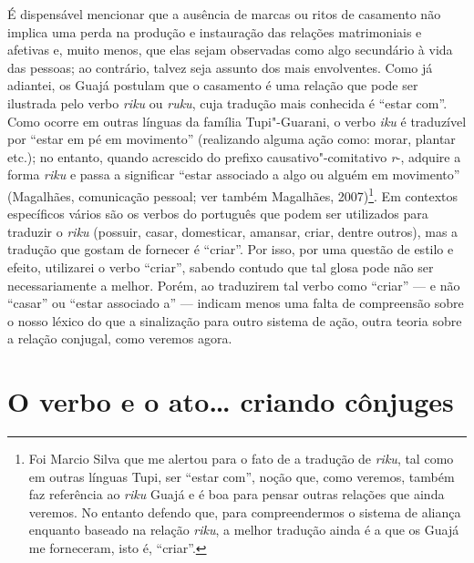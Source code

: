 É dispensável mencionar que a ausência de marcas ou ritos de casamento
não implica uma perda na produção e instauração das relações
matrimoniais e afetivas e, muito menos, que elas sejam observadas como
algo secundário à vida das pessoas; ao contrário, talvez seja assunto
dos mais envolventes. Como já adiantei, os Guajá postulam que o
casamento é uma relação que pode ser ilustrada pelo verbo \emph{riku} ou
\emph{ruku}, cuja tradução mais conhecida é ``estar com''. Como ocorre em
outras línguas da família Tupi"-Guarani, o verbo \emph{iku} é traduzível
por ``estar em pé em movimento'' (realizando alguma ação como: morar,
plantar etc.); no entanto, quando acrescido do prefixo
causativo"-comitativo \emph{r}-, adquire a forma \emph{riku} e passa a
significar ``estar associado a algo ou alguém em movimento'' (Magalhães,
comunicação pessoal; ver também Magalhães, 2007)\footnote{Foi Marcio
  Silva que me alertou para o fato de a tradução de \emph{riku}, tal
  como em outras línguas Tupi, ser ``{estar com}'', noção que, como
  veremos, também faz referência ao \emph{riku} Guajá e é boa para
  pensar outras relações que ainda veremos. No entanto defendo que, para
  compreendermos o sistema de aliança enquanto baseado na relação
  \emph{riku}, a melhor tradução ainda é a que os Guajá me forneceram,
  isto é, ``{criar}''.}. Em contextos específicos vários são os verbos do
português que podem ser utilizados para traduzir o \emph{riku} (possuir,
casar, domesticar, amansar, criar, dentre outros), mas a tradução que
gostam de fornecer é ``criar''. Por isso, por uma questão de estilo e
efeito, utilizarei o verbo ``criar'', sabendo contudo que tal glosa pode
não ser necessariamente a melhor. Porém, ao traduzirem tal verbo como
``criar'' --- e não ``casar'' ou ``estar associado a'' --- indicam menos uma falta
de compreensão sobre o nosso léxico do que a sinalização para outro
sistema de ação, outra teoria sobre a relação conjugal, como veremos
agora.

\section{O verbo e o ato\ldots{} criando
cônjuges}

